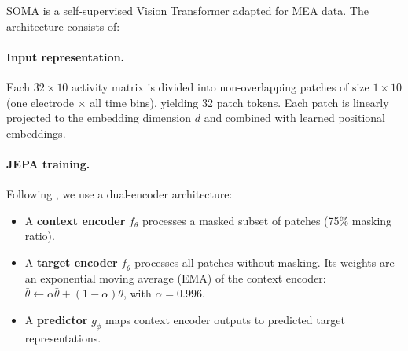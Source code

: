 \documentclass{article}
\begin{document}
SOMA is a self-supervised Vision Transformer adapted for MEA data. The architecture consists of:

\paragraph{Input representation.} Each $32 \times 10$ activity matrix is divided into non-overlapping patches of size $1 \times 10$ (one electrode $\times$ all time bins), yielding 32 patch tokens. Each patch is linearly projected to the embedding dimension $d$ and combined with learned positional embeddings.

\paragraph{JEPA training.} Following \citet{assran2023ijepa}, we use a dual-encoder architecture:
\begin{itemize}
    \item A \textbf{context encoder} $f_\theta$ processes a masked subset of patches (75\% masking ratio).
    \item A \textbf{target encoder} $f_{\bar{\theta}}$ processes all patches without masking. Its weights are an exponential moving average (EMA) of the context encoder: $\bar{\theta} \leftarrow \alpha\bar{\theta} + (1-\alpha)\theta$, with $\alpha = 0.996$.
    \item A \textbf{predictor} $g_\phi$ maps context encoder outputs to predicted target representations.
\end{itemize}
\end{document}
